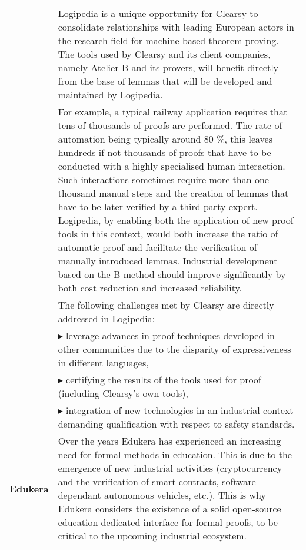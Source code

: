 \begin{longtable*}{|p{0.10\textwidth}|p{0.85\textwidth}|}
&
\hspace{0.4cm}
Logipedia is a unique opportunity for Clearsy to consolidate relationships with leading European actors in the research field for machine-based
theorem proving. The tools used by Clearsy and its client companies, namely Atelier B and its provers, will benefit directly from the base of lemmas
that will be developed and maintained by Logipedia.
\\

&
\hspace{0.4cm}
For example, a typical railway application requires that tens of thousands of proofs are performed. The rate of automation being typically around 80 \%,
this leaves hundreds if not thousands of proofs that have to be conducted with a highly specialised human interaction. Such interactions sometimes require
more than one thousand manual steps and the creation of lemmas that have to be later verified by a third-party expert.
Logipedia, by enabling both the application of new proof tools in this context, would both increase the ratio of automatic proof and facilitate the verification
of manually introduced lemmas. Industrial development based on the B method should improve significantly by both cost reduction
and increased reliability.
\\

& The following challenges met by Clearsy are
directly addressed in Logipedia:\\

& $\blacktriangleright$ leverage advances in proof techniques
developed in other communities due to the disparity of expressiveness
in different languages,\\

& $\blacktriangleright$ certifying the results of the tools used for
proof (including Clearsy's own tools),\\


& $\blacktriangleright$ integration of new technologies in an
industrial context demanding qualification with respect to safety
standards.  \\

\hline

{\bf Edukera}&

\hspace{0.4cm} Over the years Edukera has experienced an increasing
need for formal methods in education. This is due to the emergence of
new industrial activities (cryptocurrency and the verification of
smart contracts, software dependant autonomous vehicles, etc.). This
is why Edukera considers the existence of a solid open-source
education-dedicated interface for formal proofs, to be critical to the
upcoming industrial ecosystem.\\


\end{longtable*}
